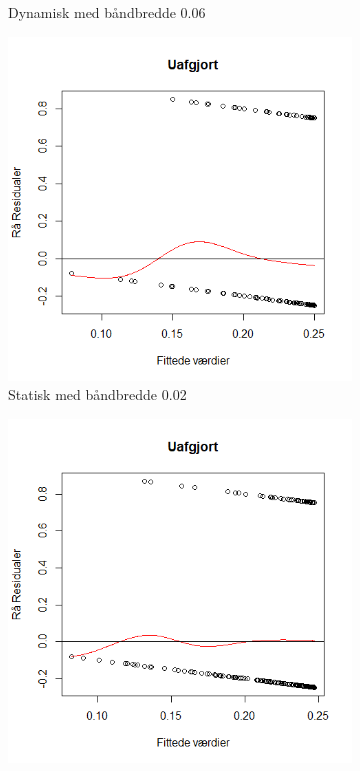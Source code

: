 \documentclass[11pt,a4paper]{article}
\begin{document}
\begin{figure}[h!]
\begin{subfigure}[b]{0.425\linewidth}
    \caption{Dynamisk med båndbredde 0.06}
    \label{fig:ResDUS}
  \end{subfigure}
  \begin{subfigure}[b]{0.425\linewidth}
    \includegraphics[width=\linewidth]{ResSU.png}
    \caption{Statisk med båndbredde 0.02}
    \label{fig:ResSU}
  \end{subfigure}
  \begin{subfigure}[b]{0.425\linewidth}
    \includegraphics[width=\linewidth]{ResDU.png}

\end{subfigure}
\end{figure}
\end{document}
